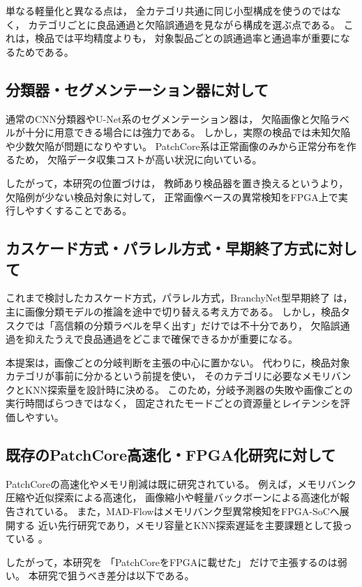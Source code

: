 \documentclass[uplatex,dvipdfmx,a4paper,11pt]{jsarticle}
\begin{document}
単なる軽量化と異なる点は，
全カテゴリ共通に同じ小型構成を使うのではなく，
カテゴリごとに良品通過と欠陥誤通過を見ながら構成を選ぶ点である。
これは，検品では平均精度よりも，
対象製品ごとの誤通過率と通過率が重要になるためである。

\subsection{分類器・セグメンテーション器に対して}

通常のCNN分類器やU-Net系のセグメンテーション器は，
欠陥画像と欠陥ラベルが十分に用意できる場合には強力である。
しかし，実際の検品では未知欠陥や少数欠陥が問題になりやすい。
PatchCore系は正常画像のみから正常分布を作るため，
欠陥データ収集コストが高い状況に向いている。

したがって，本研究の位置づけは，
教師あり検品器を置き換えるというより，
欠陥例が少ない検品対象に対して，
正常画像ベースの異常検知をFPGA上で実行しやすくすることである。

\subsection{カスケード方式・パラレル方式・早期終了方式に対して}

これまで検討したカスケード方式，パラレル方式，BranchyNet型早期終了
\cite{branchynet} は，主に画像分類モデルの推論を途中で切り替える考え方である。
しかし，検品タスクでは「高信頼の分類ラベルを早く出す」だけでは不十分であり，
欠陥誤通過を抑えたうえで良品通過をどこまで確保できるかが重要になる。

本提案は，画像ごとの分岐判断を主張の中心に置かない。
代わりに，検品対象カテゴリが事前に分かるという前提を使い，
そのカテゴリに必要なメモリバンクとKNN探索量を設計時に決める。
このため，分岐予測器の失敗や画像ごとの実行時間ばらつきではなく，
固定されたモードごとの資源量とレイテンシを評価しやすい。

\subsection{既存のPatchCore高速化・FPGA化研究に対して}

PatchCoreの高速化やメモリ削減は既に研究されている。
例えば，メモリバンク圧縮や近似探索による高速化，
画像縮小や軽量バックボーンによる高速化が報告されている。
また，MAD-Flowはメモリバンク型異常検知をFPGA-SoCへ展開する
近い先行研究であり，メモリ容量とKNN探索遅延を主要課題として扱っている
\cite{madflow}。

したがって，本研究を
「PatchCoreをFPGAに載せた」
だけで主張するのは弱い。
本研究で狙うべき差分は以下である。
\end{document}
